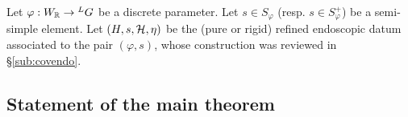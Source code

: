 \documentclass{article}
\theoremstyle{definition}
\numberwithin{equation}{section}
\renewcommand{\-}{\hyp{}}
\newcommand{\warn}[1]{{\leavevmode\color{red}[#1]}}
\begin{document}
Let $\varphi : W_{\mathbb{R}} \to {^LG}$ be a discrete parameter. Let $s \in S_\varphi$ (resp. $s \in S_\varphi^+$) be a semi-simple element. Let $(H,s,\mathcal{H},\eta)$ be the (pure or rigid) refined endoscopic datum associated to the pair $(\varphi,s)$, whose construction was reviewed in \S\ref{sub:covendo}.










\subsection{Statement of the main theorem}
\end{document}
